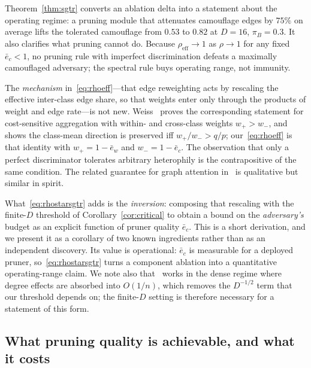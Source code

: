 \documentclass[../elsevier.tex]{subfiles}
\begin{document}
Theorem~\ref{thm:sgtr} converts an ablation delta into a statement about the
operating regime: a pruning module that attenuates camouflage edges by $75\%$ on
average lifts the tolerated camouflage from $0.53$ to $0.82$ at $D=16$,
$\pi_B = 0.3$. It also clarifies what pruning cannot do. Because
$\rho_{\mathrm{eff}} \to 1$ as $\rho \to 1$ for any fixed $\bar e_c < 1$, no
pruning rule with imperfect discrimination defeats a maximally camouflaged
adversary; the spectral rule buys operating range, not immunity.

\begin{remark}
\label{rem:sgtr-priority}
The \emph{mechanism} in~\eqref{eq:rhoeff}---that edge reweighting acts by rescaling
the effective inter-class edge share, so that weights enter only through the products
of weight and edge rate---is not new. Weiss~\citeyearpar[Thm.~2]{weiss2026cost} proves the
corresponding statement for cost-sensitive aggregation with within- and
cross-class weights $w_+ > w_-$, and shows the class-mean direction is preserved iff
$w_+/w_- > q/p$; our~\eqref{eq:rhoeff} is that identity with $w_+ = 1-\bar e_w$ and
$w_- = 1-\bar e_c$. The observation that only a perfect discriminator tolerates
arbitrary heterophily is the contrapositive of the same condition. The related
guarantee for graph attention in~\citep{fountoulakis2023graph} is qualitative but
similar in spirit.

What~\eqref{eq:rhostarsgtr} adds is the \emph{inversion}: composing that rescaling
with the finite-$D$ threshold of Corollary~\ref{cor:critical} to obtain a bound on the
\emph{adversary's} budget as an explicit function of pruner quality $\bar e_c$. This
is a short derivation, and we present it as a corollary of two known ingredients
rather than as an independent discovery. Its value is operational: $\bar e_c$ is
measurable for a deployed pruner, so~\eqref{eq:rhostarsgtr} turns a component
ablation into a quantitative operating-range claim. We note also
that~\citep{weiss2026cost} works in the dense regime where degree effects are absorbed
into $O(1/n)$, which removes the $D^{-1/2}$ term that our threshold depends on; the
finite-$D$ setting is therefore necessary for a statement of this form.
\end{remark}

\subsection{What pruning quality is achievable, and what it costs}
\label{sec:achievable}
\end{document}

